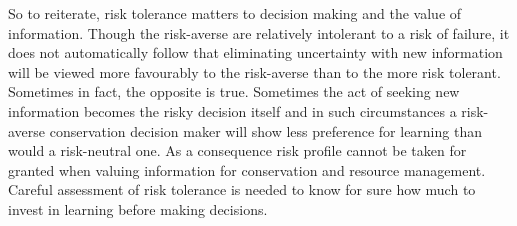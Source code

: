\documentclass[]{article}
\theoremstyle{definition}
\theoremstyle{definition}
\theoremstyle{definition}
\theoremstyle{remark}
\begin{document}
So to reiterate, risk tolerance matters to decision making and the value
of information. Though the risk-averse are relatively intolerant to a
risk of failure, it does not automatically follow that eliminating
uncertainty with new information will be viewed more favourably to the
risk-averse than to the more risk tolerant. Sometimes in fact, the
opposite is true. Sometimes the act of seeking new information becomes
the risky decision itself and in such circumstances a risk-averse
conservation decision maker will show less preference for learning than
would a risk-neutral one. As a consequence risk profile cannot be taken
for granted when valuing information for conservation and resource
management. Careful assessment of risk tolerance is needed to know for
sure how much to invest in learning before making decisions.


\end{document}
